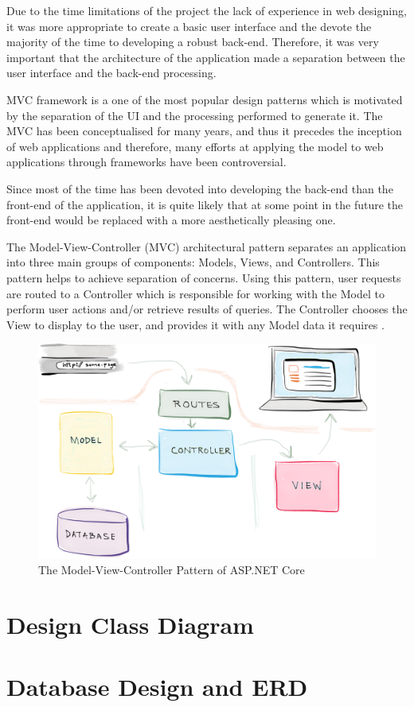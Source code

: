 Due to the time limitations of the project the lack of experience in web designing, it was more appropriate to create a basic user interface and the devote the majority of the time to developing a robust back-end. Therefore, it was very important that the architecture of the application made a separation between the user interface and the back-end processing.

MVC framework is a one of the most popular design patterns which is motivated by the separation of the  UI and the processing performed to generate it. The MVC has been conceptualised for many years, and thus it precedes the inception of web applications and therefore, many efforts at applying the model to web applications through frameworks have been controversial.

Since most of the time has been devoted into developing the back-end than the front-end of the application, it is quite likely that at some point in the future the front-end would be replaced with a more aesthetically pleasing one.


The Model-View-Controller (MVC) architectural pattern separates an application into three main groups of components: Models, Views, and Controllers. This pattern helps to achieve separation of concerns. Using this pattern, user requests are routed to a Controller which is responsible for working with the Model to perform user actions and/or retrieve results of queries. The Controller chooses the View to display to the user, and provides it with any Model data it requires \cite{mvc}.


\begin{figure}[h]
\begin{center}
\includegraphics[width=17cm]{imgs/mvc.png}
\end{center}\vspace{-0.3cm}
\caption[The Model-View-Controller Pattern of ASP.NET Core]{The Model-View-Controller Pattern of ASP.NET Core} \label{mvc}
\end{figure}




\section{Design Class Diagram}
\label{sub:design_class_diagram}
 
\section{Database Design and ERD}
\label{sub:database_design_and_erd}


